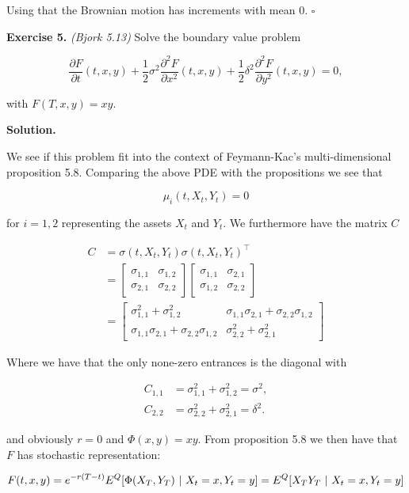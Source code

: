 \documentclass[
]{book}
\begin{document}
Using that the Brownian motion has increments with mean 0. \(\square\)

\textbf{Exercise 5.} \emph{(Bjork 5.13)} Solve the boundary value problem

\[
\frac{\partial F}{\partial t}(t,x,y)+\frac{1}{2}\sigma^2 \frac{\partial^2F}{\partial x^2}(t,x,y)+\frac{1}{2}\delta^2\frac{\partial^2F}{\partial y^2}(t,x,y)=0,
\]

with \(F(T,x,y)=xy\).

\textbf{Solution.}

We see if this problem fit into the context of Feymann-Kac's multi-dimensional proposition 5.8. Comparing the above PDE with the propositions we see that

\[
\mu_i(t,X_t,Y_t)=0
\]

for \(i=1,2\) representing the assets \(X_t\) and \(Y_t\). We furthermore have the matrix \(C\)

\begin{align*}
C&=\sigma(t,X_t,Y_t)\sigma(t,X_t,Y_t)^\top\\
&=
\begin{bmatrix}
\sigma_{1,1} &\sigma_{1,2}\\
\sigma_{2,1}& \sigma_{2,2}
\end{bmatrix}\begin{bmatrix}
\sigma_{1,1} &\sigma_{2,1}\\
\sigma_{1,2}& \sigma_{2,2}
\end{bmatrix}\\
&=
\begin{bmatrix}
\sigma_{1,1}^2+\sigma_{1,2}^2 & \sigma_{1,1}\sigma_{2,1}+\sigma_{2,2}\sigma_{1,2}\\
\sigma_{1,1}\sigma_{2,1}+\sigma_{2,2}\sigma_{1,2} & \sigma_{2,2}^2+\sigma_{2,1}^2
\end{bmatrix}
\end{align*}

Where we have that the only none-zero entrances is the diagonal with

\begin{align*}
C_{1,1}&=\sigma_{1,1}^2+\sigma_{1,2}^2 = \sigma^2,\\
C_{2,2}&=\sigma_{2,2}^2+\sigma_{2,1}^2=\delta^2.
\end{align*}

and obviously \(r=0\) and \(\Phi(x,y)=xy\). From proposition 5.8 we then have that \(F\) has stochastic representation:

\[
F(t,x,y)=e^{-r(T-t)}E^Q[\Phi(X_T,Y_T)\ \vert\ X_t=x,Y_t=y]\\
=E^Q[X_TY_T\ \vert\ X_t=x,Y_t=y]
\]
\end{document}
